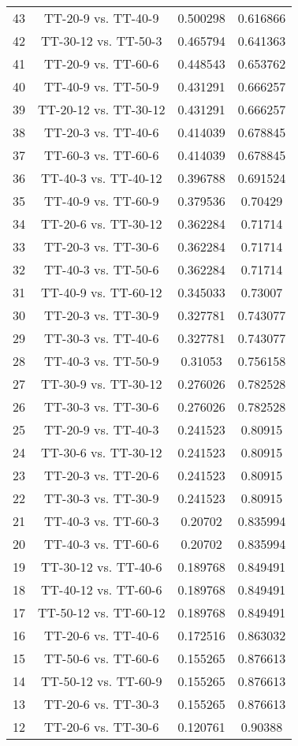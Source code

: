 \documentclass[a4paper,10pt]{article}
\begin{document}
\begin{landscape}
\begin{table}[!htp]
\begin{tabular}{cccc}
43&TT-20-9 vs. TT-40-9&0.500298&0.616866\\
42&TT-30-12 vs. TT-50-3&0.465794&0.641363\\
41&TT-20-9 vs. TT-60-6&0.448543&0.653762\\
40&TT-40-9 vs. TT-50-9&0.431291&0.666257\\
39&TT-20-12 vs. TT-30-12&0.431291&0.666257\\
38&TT-20-3 vs. TT-40-6&0.414039&0.678845\\
37&TT-60-3 vs. TT-60-6&0.414039&0.678845\\
36&TT-40-3 vs. TT-40-12&0.396788&0.691524\\
35&TT-40-9 vs. TT-60-9&0.379536&0.70429\\
34&TT-20-6 vs. TT-30-12&0.362284&0.71714\\
33&TT-20-3 vs. TT-30-6&0.362284&0.71714\\
32&TT-40-3 vs. TT-50-6&0.362284&0.71714\\
31&TT-40-9 vs. TT-60-12&0.345033&0.73007\\
30&TT-20-3 vs. TT-30-9&0.327781&0.743077\\
29&TT-30-3 vs. TT-40-6&0.327781&0.743077\\
28&TT-40-3 vs. TT-50-9&0.31053&0.756158\\
27&TT-30-9 vs. TT-30-12&0.276026&0.782528\\
26&TT-30-3 vs. TT-30-6&0.276026&0.782528\\
25&TT-20-9 vs. TT-40-3&0.241523&0.80915\\
24&TT-30-6 vs. TT-30-12&0.241523&0.80915\\
23&TT-20-3 vs. TT-20-6&0.241523&0.80915\\
22&TT-30-3 vs. TT-30-9&0.241523&0.80915\\
21&TT-40-3 vs. TT-60-3&0.20702&0.835994\\
20&TT-40-3 vs. TT-60-6&0.20702&0.835994\\
19&TT-30-12 vs. TT-40-6&0.189768&0.849491\\
18&TT-40-12 vs. TT-60-6&0.189768&0.849491\\
17&TT-50-12 vs. TT-60-12&0.189768&0.849491\\
16&TT-20-6 vs. TT-40-6&0.172516&0.863032\\
15&TT-50-6 vs. TT-60-6&0.155265&0.876613\\
14&TT-50-12 vs. TT-60-9&0.155265&0.876613\\
13&TT-20-6 vs. TT-30-3&0.155265&0.876613\\
12&TT-20-6 vs. TT-30-6&0.120761&0.90388\\

\end{tabular}
\end{table}
\end{landscape}
\end{document}
